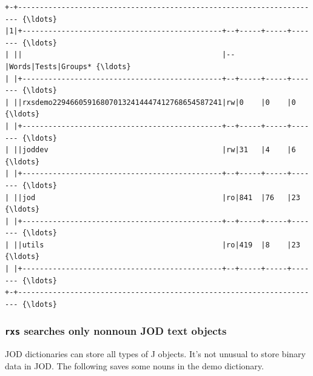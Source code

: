 \documentclass[11pt,letter,landscape]{article}
\begin{document}
    \begin{Verbatim}[commandchars=\\\{\}]
+-+---------------------------------------------------------------------- {\ldots}
|1|+----------------------------------------------+--+-----+-----+------- {\ldots}
| ||                                              |--|Words|Tests|Groups* {\ldots}
| |+----------------------------------------------+--+-----+-----+------- {\ldots}
| ||rxsdemo229466059168070132414447412768654587241|rw|0    |0    |0       {\ldots}
| |+----------------------------------------------+--+-----+-----+------- {\ldots}
| ||joddev                                        |rw|31   |4    |6       {\ldots}
| |+----------------------------------------------+--+-----+-----+------- {\ldots}
| ||jod                                           |ro|841  |76   |23      {\ldots}
| |+----------------------------------------------+--+-----+-----+------- {\ldots}
| ||utils                                         |ro|419  |8    |23      {\ldots}
| |+----------------------------------------------+--+-----+-----+------- {\ldots}
+-+---------------------------------------------------------------------- {\ldots}
    \end{Verbatim}

    \hypertarget{rxs-searches-only-nonnoun-jod-text-objects}{%
\subsubsection{\texorpdfstring{\texttt{rxs} searches only nonnoun JOD
text
objects}{rxs searches only nonnoun JOD text objects}}\label{rxs-searches-only-nonnoun-jod-text-objects}}

JOD dictionaries can store all types of J objects. It's not unusual to
store binary data in JOD. The following saves some nouns in the demo
dictionary.
\end{document}
